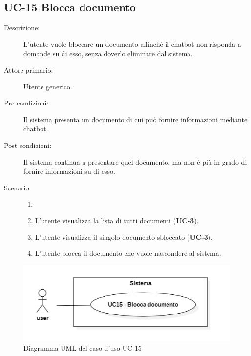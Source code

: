 \subsection{UC-15 Blocca documento}
\begin{description}
    \item[Descrizione:] L'utente vuole bloccare un documento affinché il chatbot non risponda a domande su di esso, senza doverlo eliminare dal sistema.
    \item[Attore primario:] Utente generico.
    \item[Pre condizioni:] Il sistema presenta un documento di cui può fornire informazioni mediante chatbot.
    \item[Post condizioni:] Il sistema continua a presentare quel documento, ma non è più in grado di fornire informazioni su di esso.
    \item[Scenario:]
    \begin{enumerate}
        \item[]
        \item L’utente visualizza la lista di tutti documenti (\textbf{UC-3}).
        \item L'utente visualizza il singolo documento sbloccato (\textbf{UC-3}).
        \item L'utente blocca il documento che vuole nascondere al sistema.
    \end{enumerate}
\end{description}

\begin{figure}[H]
    \centering
    \includegraphics[width=0.8\linewidth]{UC15.PNG}
    \caption{Diagramma UML del caso d'uso UC-15}
\end{figure}


